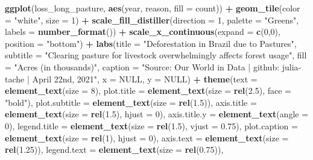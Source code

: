 \documentclass[
]{article}
\newenvironment{Shaded}{\begin{snugshade}}{\end{snugshade}}
\newcommand{\DataTypeTok}[1]{\textcolor[rgb]{0.13,0.29,0.53}{#1}}
\newcommand{\DecValTok}[1]{\textcolor[rgb]{0.00,0.00,0.81}{#1}}
\newcommand{\FloatTok}[1]{\textcolor[rgb]{0.00,0.00,0.81}{#1}}
\newcommand{\KeywordTok}[1]{\textcolor[rgb]{0.13,0.29,0.53}{\textbf{#1}}}
\newcommand{\NormalTok}[1]{#1}
\newcommand{\OperatorTok}[1]{\textcolor[rgb]{0.81,0.36,0.00}{\textbf{#1}}}
\newcommand{\OtherTok}[1]{\textcolor[rgb]{0.56,0.35,0.01}{#1}}
\newcommand{\StringTok}[1]{\textcolor[rgb]{0.31,0.60,0.02}{#1}}
\begin{document}
\begin{Shaded}
\begin{Highlighting}[]
\KeywordTok{ggplot}\NormalTok{(loss\_long\_pasture, }\KeywordTok{aes}\NormalTok{(year, reason, }\DataTypeTok{fill =}\NormalTok{ count)) }\OperatorTok{+}\StringTok{ }
\StringTok{  }\KeywordTok{geom\_tile}\NormalTok{(}\DataTypeTok{color =} \StringTok{"white"}\NormalTok{, }\DataTypeTok{size =} \DecValTok{1}\NormalTok{) }\OperatorTok{+}\StringTok{ }
\StringTok{  }\KeywordTok{scale\_fill\_distiller}\NormalTok{(}\DataTypeTok{direction =} \DecValTok{1}\NormalTok{, }\DataTypeTok{palette =} \StringTok{"Greens"}\NormalTok{, }\DataTypeTok{labels =} \KeywordTok{number\_format}\NormalTok{()) }\OperatorTok{+}
\StringTok{  }\KeywordTok{scale\_x\_continuous}\NormalTok{(}\DataTypeTok{expand =} \KeywordTok{c}\NormalTok{(}\DecValTok{0}\NormalTok{,}\DecValTok{0}\NormalTok{), }\DataTypeTok{position =} \StringTok{"bottom"}\NormalTok{) }\OperatorTok{+}
\StringTok{  }\KeywordTok{labs}\NormalTok{(}\DataTypeTok{title =} \StringTok{"Deforestation in Brazil due to Pastures"}\NormalTok{,}
    \DataTypeTok{subtitle =} \StringTok{"Clearing pasture for livestock overwhelmingly affects forest usage"}\NormalTok{,}
    \DataTypeTok{fill =} \StringTok{"Acres (in thousands)"}\NormalTok{,}
    \DataTypeTok{caption =} \StringTok{"Source: Our World in Data | github: julia{-}tache | April 22nd, 2021"}\NormalTok{,}
    \DataTypeTok{x =} \OtherTok{NULL}\NormalTok{, }
    \DataTypeTok{y =} \OtherTok{NULL}\NormalTok{) }\OperatorTok{+}\StringTok{ }
\StringTok{  }\KeywordTok{theme}\NormalTok{(}\DataTypeTok{text =} \KeywordTok{element\_text}\NormalTok{(}\DataTypeTok{size =} \DecValTok{8}\NormalTok{),}
        \DataTypeTok{plot.title =} \KeywordTok{element\_text}\NormalTok{(}\DataTypeTok{size =} \KeywordTok{rel}\NormalTok{(}\FloatTok{2.5}\NormalTok{), }\DataTypeTok{face =} \StringTok{"bold"}\NormalTok{),}
        \DataTypeTok{plot.subtitle =} \KeywordTok{element\_text}\NormalTok{(}\DataTypeTok{size =} \KeywordTok{rel}\NormalTok{(}\FloatTok{1.5}\NormalTok{)),}
        \DataTypeTok{axis.title =} \KeywordTok{element\_text}\NormalTok{(}\DataTypeTok{size =} \KeywordTok{rel}\NormalTok{(}\FloatTok{1.5}\NormalTok{), }\DataTypeTok{hjust =} \DecValTok{0}\NormalTok{), }
        \DataTypeTok{axis.title.y =} \KeywordTok{element\_text}\NormalTok{(}\DataTypeTok{angle =} \DecValTok{0}\NormalTok{),}
        \DataTypeTok{legend.title =} \KeywordTok{element\_text}\NormalTok{(}\DataTypeTok{size =} \KeywordTok{rel}\NormalTok{(}\FloatTok{1.5}\NormalTok{), }\DataTypeTok{vjust =} \FloatTok{0.75}\NormalTok{),}
        \DataTypeTok{plot.caption =} \KeywordTok{element\_text}\NormalTok{(}\DataTypeTok{size =} \KeywordTok{rel}\NormalTok{(}\DecValTok{1}\NormalTok{), }\DataTypeTok{hjust =} \DecValTok{0}\NormalTok{),}
        \DataTypeTok{axis.text =} \KeywordTok{element\_text}\NormalTok{(}\DataTypeTok{size =} \KeywordTok{rel}\NormalTok{(}\FloatTok{1.25}\NormalTok{)),}
        \DataTypeTok{legend.text =} \KeywordTok{element\_text}\NormalTok{(}\DataTypeTok{size =} \KeywordTok{rel}\NormalTok{(}\FloatTok{0.75}\NormalTok{)),}
        

\end{Highlighting}
\end{Shaded}
\end{document}
